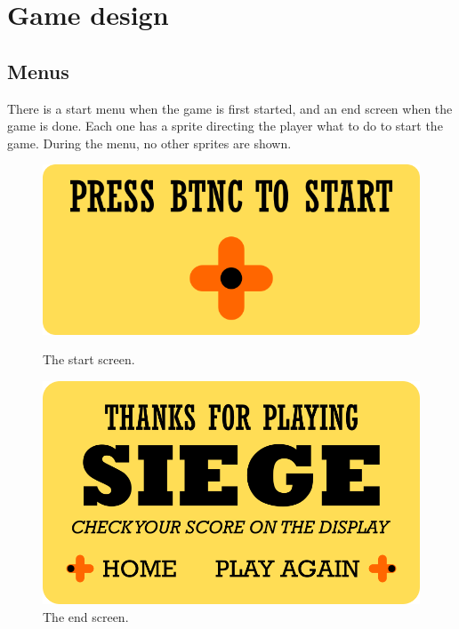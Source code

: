 \documentclass{ifda}
\begin{document}
\section{Game design}

\subsection{Menus}
There is a start menu when the game is first started, and an end screen when the game is done. Each one has a sprite directing the player what to do to start the game. During the menu, no other sprites are shown.\\

\begin{figure}[h!]
    \centering
    \begin{minipage}{0.45\textwidth}
        \centering
        \includegraphics[width=1\textwidth]{ start }
        \caption{The start screen.}
        \label{fig:sync_count}
    \end{minipage}\hfill
    \begin{minipage}{0.40\textwidth}
        \centering
        \includegraphics[width=1\textwidth]{ end }
        \caption{The end screen.}
        \label{fig:code1}
    \end{minipage}
\end{figure}
\end{document}
